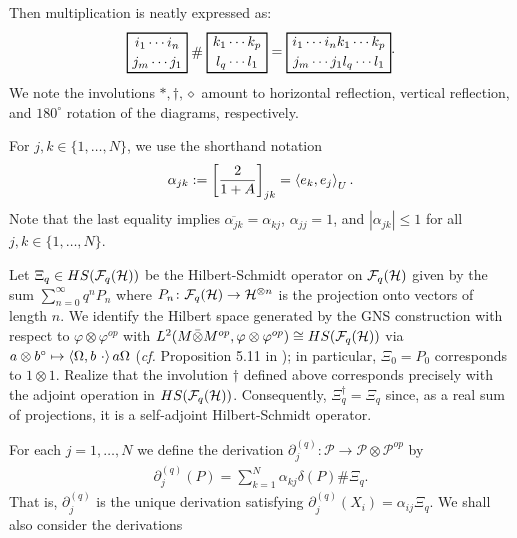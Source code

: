 Then multiplication is neatly expressed as:
	\begin{align*}
	\begin{tikzpicture}[baseline]
	\draw[thick] (0,-.5) rectangle (1.5,.5);
	\node at (.75,.25) {$i_1\cdots i_n$};
	\node at (.75,-.25) {$j_m\cdots j_1$};
	\node at (1.75,0) {$\#$};
	\draw[thick] (2,-.5) rectangle (3.5,.5);
	\node at (2.75,.25) {$k_1\cdots k_p$};
	\node at (2.75,-.25) {$l_q\cdots l_1$};
	\node at (3.75,0) {$=$};
	\draw[thick] (4,-.5) rectangle (6.6,.5);
	\node at (5.3,.25) {$i_1\cdots i_nk_1\cdots k_p$};
	\node at (5.3,-.25) {$j_m\cdots j_1l_q\cdots l_1$};
	\end{tikzpicture}.
	\end{align*}
We note the involutions $*,\dagger,\diamond$ amount to horizontal reflection, vertical reflection, and $180^\circ$ rotation of the diagrams, respectively.\par
For $j,k\in\{1,\ldots, N\}$, we use the shorthand notation
	\begin{align*}
		\alpha_{jk}:=\left[ \frac{2}{1+A}\right]_{jk} =\left\langle e_k,e_j\right\rangle_U.
	\end{align*}
Note that the last equality implies $\overline{\alpha_{jk}}=\alpha_{kj}$, $\alpha_{jj}=1$, and $|\alpha_{jk}|\leq 1$ for all $j,k\in\{1,\ldots, N\}$.\par
Let $\Xi_q \in HS(\mathcal{F}_q(\mathcal H))$ be the Hilbert-Schmidt operator on $\mathcal{F}_q(\mathcal H)$ given by the sum $\sum_{n=0}^\infty q^n P_n$ where $P_n\colon \mathcal{F}_q(\mathcal H) \rightarrow \mathcal H^{\otimes n}$ is the projection onto vectors of length $n$. We identify the Hilbert space generated by the GNS construction with respect to $\varphi\otimes\varphi^{op}$ with $L^2(M\bar{\otimes}M^{op},\varphi\otimes\varphi^{op})\cong HS(\mathcal{F}_q(\mathcal H))$ via $a\otimes b^\circ\mapsto \left\langle\Omega, b\ \cdot\right\rangle a\Omega$ (\emph{cf.} Proposition 5.11 in \cite{Voi94}); in particular, $\Xi_0= P_0$ corresponds to $1\otimes 1$. Realize that the involution $\dagger$ defined above corresponds precisely with the adjoint operation in $HS(\mathcal{F}_q(\mathcal H))$. Consequently, $\Xi_q^\dagger=\Xi_q$ since, as a real sum of projections, it is a self-adjoint Hilbert-Schmidt operator.\par
For each $j=1,\ldots, N$ we define the derivation $\partial_j^{(q)}\colon\mathscr{P}\rightarrow \mathscr{P}\otimes \mathscr{P}^{op}$ by
	\begin{align*}
		\partial_j^{(q)}(P)=\sum_{k=1}^N \alpha_{kj}\delta(P)\#\Xi_q.
	\end{align*}
That is, $\partial_j^{(q)}$ is the unique derivation satisfying $\partial_j^{(q)}(X_i)=\alpha_{ij}\Xi_q$. We shall also consider the derivations
